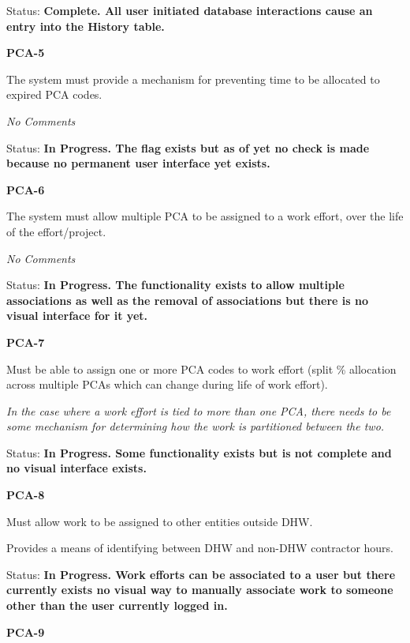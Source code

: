 \documentclass{article}
\begin{document}
\noindent Status: \textbf{Complete.  All user initiated database interactions cause an entry into the History table.}

\noindent 

\noindent \textbf{PCA-5}

\noindent The system must provide a mechanism for preventing time to be allocated to expired PCA codes.

\textit{No Comments}

\noindent Status: \textbf{In Progress.  The flag exists but as of yet no check is made because no permanent user interface yet exists.}

\noindent 

\noindent \textbf{PCA-6}

\noindent The system must allow multiple PCA to be assigned to a work effort, over the life of the effort/project.

\textit{No Comments}

\noindent Status: \textbf{In Progress.  The functionality exists to allow multiple associations as well as the removal of associations but there is no visual interface for it yet.}

\noindent 

\noindent \textbf{PCA-7}

\noindent Must be able to assign one or more PCA codes to work effort (split \% allocation across multiple PCAs which can change during life of work effort).

\noindent \textit{In the case where a work effort is tied to more than one PCA, there needs to be some mechanism for determining how the work is partitioned between the two.}

\noindent Status: \textbf{In Progress.  Some functionality exists but is not complete and no visual interface exists.}

\noindent 

\noindent \textbf{PCA-8}

\noindent Must allow work to be assigned to other entities outside DHW.

Provides a means of identifying between DHW and non-DHW contractor hours.

\noindent Status: \textbf{In Progress.   Work efforts can be associated to a user but there currently exists no visual way to manually associate work to someone other than the user currently logged in.}



\noindent \textbf{PCA-9}
\end{document}
